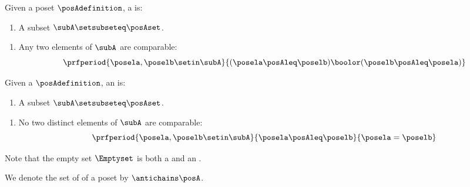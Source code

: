 \begin{definition}
    \label{def:chain}
    Given a poset $\posAdefinition$, a  is:

    \constit
    \begin{enumerate}
        \item A subset $\subA \setsubseteq \posAset$.
    \end{enumerate}

    \condit
    \begin{enumerate}
        \item Any two elements of $\subA$ are comparable:
              \begin{equation}\label{eq:chain}
                  \prfperiod{
                      \posela,\poselb \setin \subA
                  }{
                      (\posela \posAleq \poselb) \boolor (\poselb \posAleq \posela)
                  }
              \end{equation}
    \end{enumerate}
\end{definition}


\begin{definition}
    \label{def:antichain}
    Given a  $\posAdefinition$, an  is:

    \constit
    \begin{enumerate}
        \item A subset $\subA \setsubseteq \posAset$.
    \end{enumerate}

    \condit
    \begin{enumerate}
        \item No two distinct elements of $\subA$ are comparable:
              \begin{equation}\label{eq:antichain}
                  \prfperiod{
                      \posela, \poselb \setin \subA
                  }{
                      \posela \posAleq \poselb
                  }{
                      \posela = \poselb
                  }
              \end{equation}
    \end{enumerate}
\end{definition}
\begin{remark}
    Note that the empty set $\Emptyset$ is both a  and an .
\end{remark}

We denote the set of  of a poset \posA by $\antichains\posA$.

